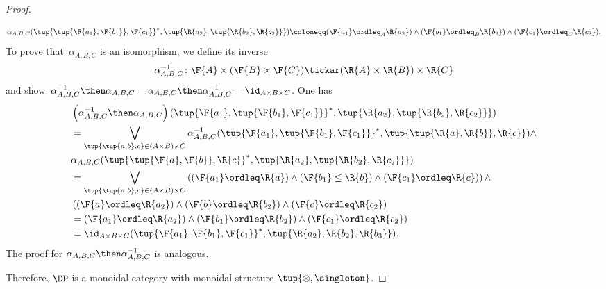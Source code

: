\begin{proof}
\begin{itemize}
    \begin{equation}
        \alpha_{A,B,C}(\tup{\tup{\F{a_1},\F{b_1}},\F{c_1}}^*,\tup{\R{a_2},\tup{\R{b_2},\R{c_2}}})\coloneqq (\F{a_1}\ordleq_A \R{a_2}) \wedge (\F{b_1} \ordleq_B \R{b_2})\wedge (\F{c_1}\ordleq_C \R{c_2}).
    \end{equation}
    To prove that~$\alpha_{A,B,C}$ is an isomorphism, we define its inverse \begin{equation}
        \alpha_{A,B,C}^{-1}\colon \F{A}\times (\F{B}\times \F{C}) \tickar (\R{A}\times \R{B})\times \R{C}
    \end{equation}
    and show~$\alpha_{A,B,C}^{-1}\then \alpha_{A,B,C}=\alpha_{A,B,C}\then \alpha_{A,B,C}^{-1}= \id_{A\times B\times C}$. One has
    \begin{equation}
        \begin{aligned}
           &\left( \alpha_{A,B,C}^{-1}\then \alpha_{A,B,C} \right)(\tup{\F{a_1},\tup{\F{b_1},\F{c_1}}}^*,\tup{\R{a_2},\tup{\R{b_2},\R{c_2}}})\\
           &=\bigvee_{\tup{\tup{a,b},c}\in (A\times B)\times C}
           \alpha_{A,B,C}^{-1}(\tup{\F{a_1},\tup{\F{b_1},\F{c_1}}}^*,\tup{\tup{\R{a},\R{b}},\R{c}})\wedge\\
           &\alpha_{A,B,C}(\tup{\tup{\F{a},\F{b}},\R{c}}^*,\tup{\R{a_2},\tup{\R{b_2},\R{c_2}}})\\
           &=\bigvee_{\tup{\tup{a,b},c}\in (A\times B)\times C}\left( (\F{a_1}\ordleq \R{a}) \wedge (\F{b_1}\leq \R{b}) \wedge (\F{c_1}\ordleq \R{c})\right)\wedge \\
           & \left((\F{a}\ordleq \R{a_2})\wedge (\F{b}\ordleq \R{b_2}) \wedge (\F{c}\ordleq \R{c_2}\right)\\
           &=(\F{a_1}\ordleq \R{a_2}) \wedge (\F{b_1}\ordleq \R{b_2}) \wedge (\F{c_1}\ordleq \R{c_2})\\
           &=\id_{A\times B\times C}(\tup{\F{a_1},\F{b_1},\F{c_1}}^*,\tup{\R{a_2},\R{b_2},\R{b_3}}).
        \end{aligned}
    \end{equation}
The proof for $\alpha_{A,B,C}\then \alpha_{A,B,C}^{-1}$ is analogous.
\end{itemize}
Therefore, $\DP$ is a monoidal category with monoidal structure $\tup{\otimes, \singleton}$.
\end{proof}



